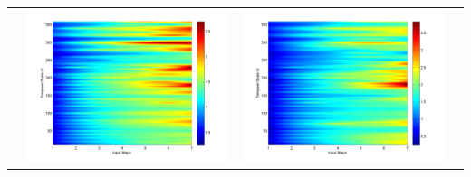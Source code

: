 \documentclass[11pt]{article}
\begin{document}
\begin{table}[H]
{\begin{tabular}{c  c   c   c  }
&\begin{minipage}{.3\textwidth}\includegraphics[width=\linewidth]{resultgraph/02165000pep.png}\end{minipage}
&\begin{minipage}{.3\textwidth}\includegraphics[width=\linewidth]{resultgraph/02165000pepq.png}\end{minipage}
\\

\end{tabular}}
\end{table}
\end{document}
